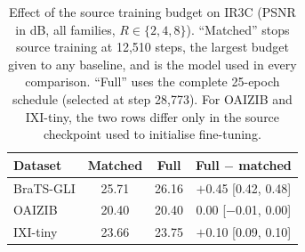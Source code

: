 \begin{table}[pos=!htbp]
\caption{Effect of the source training budget on IR3C (PSNR in dB, all families, $R\in\{2,4,8\}$). ``Matched'' stops source training at 12,510 steps, the largest budget given to any baseline, and is the model used in every comparison. ``Full'' uses the complete 25-epoch schedule (selected at step 28,773). For OAIZIB and IXI-tiny, the two rows differ only in the source checkpoint used to initialise fine-tuning.}
\label{tab:budget}
\footnotesize\setlength{\tabcolsep}{3pt}
\begin{tabular*}{\columnwidth}{@{\extracolsep{\fill}}lccc@{}}
\toprule
Dataset & Matched & Full & Full $-$ matched \\
\midrule
BraTS-GLI & 25.71 & 26.16 & $+$0.45 [0.42, 0.48] \\
OAIZIB & 20.40 & 20.40 & 0.00 [$-$0.01, 0.00] \\
IXI-tiny & 23.66 & 23.75 & $+$0.10 [0.09, 0.10] \\
\bottomrule
\end{tabular*}
\end{table}
